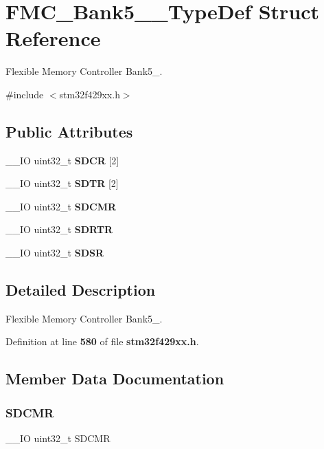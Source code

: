 \section{F\+M\+C\+\_\+\+Bank5\+\_\+\_\+\+Type\+Def Struct Reference}
\label{structFMC__Bank5__6__TypeDef}


Flexible Memory Controller Bank5\+\_.  




{\ttfamily \#include $<$stm32f429xx.\+h$>$}

\subsection*{Public Attributes}
\begin{DoxyCompactItemize}
\item 
\+\_\+\+\_\+\+IO uint32\+\_\+t \textbf{ S\+D\+CR} [2]
\item 
\+\_\+\+\_\+\+IO uint32\+\_\+t \textbf{ S\+D\+TR} [2]
\item 
\+\_\+\+\_\+\+IO uint32\+\_\+t \textbf{ S\+D\+C\+MR}
\item 
\+\_\+\+\_\+\+IO uint32\+\_\+t \textbf{ S\+D\+R\+TR}
\item 
\+\_\+\+\_\+\+IO uint32\+\_\+t \textbf{ S\+D\+SR}
\end{DoxyCompactItemize}


\subsection{Detailed Description}
Flexible Memory Controller Bank5\+\_. 

Definition at line \textbf{ 580} of file \textbf{ stm32f429xx.\+h}.



\subsection{Member Data Documentation}
\mbox{\label{structFMC__Bank5__6__TypeDef_a6722a71defead0b07cca1b79fab0fe88}} 
\subsubsection{S\+D\+C\+MR}
{\footnotesize\ttfamily \+\_\+\+\_\+\+IO uint32\+\_\+t S\+D\+C\+MR}

